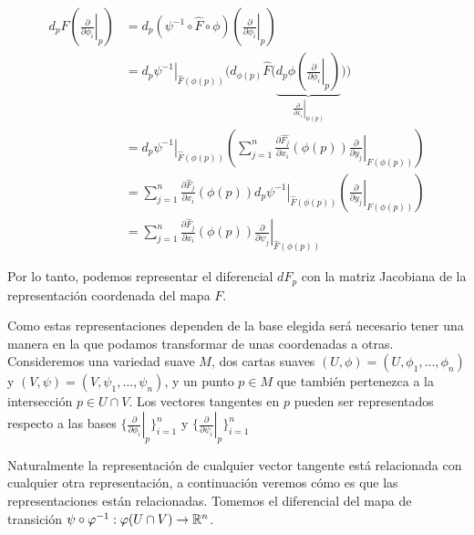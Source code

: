 \begingroup
\allowdisplaybreaks
\begin{align*}
	d_{p}F \left( \left. \frac{\partial}{\partial \phi_i} \right|_{p}\right) & =
	d_p(\psi^{-1}\circ\hat{F}\circ \phi)\left(\left.\frac{\partial}{\partial \phi_i}\right |_p\right) \\
	                                                                         & =
	\left. d_p \psi^{-1} \right|_{\hat{F}(\phi(p))}
	\Biggl(
	d_{\phi(p)} \hat{F}
	\Biggl(
	\underbrace{d_p \phi
		\left(
		\left. \frac{\partial}{\partial \phi_i} \right|_{p}
		\right)}_{\left. \frac{\partial}{\partial x_i} \right|_{\phi (p)}}
	\Biggr)	\Biggr)\\
	                                                                         & =
	\left. d_p \psi^{-1} \right|_{\hat{F}(\phi(p))}
	\left(
	\sum_{j=1}^{n} \frac{\partial \hat{F_j}}{\partial x_i} \left( \phi(p) \right)
	\left. \frac{\partial}{\partial y_j} \right|_{F(\phi(p))}
	\right)                                                                                           \\
	                                                                         & =
	\sum_{j=1}^{n} \frac{\partial \hat{F}_j}{\partial x_i} (\phi(p))
	\left. d_p \psi^{-1} \right|_{\hat{F}(\phi(p))}
	\left(
	\left. \frac{\partial}{\partial y_j}\right|_{F(\phi(p))}
	\right)                                                                                           \\
	                                                                         & =
	\sum_{j=1}^{n} \frac{\partial \hat{F}_j}{\partial x_i} (\phi(p))
	\left.
	\frac{\partial}{\partial \psi_{j}}
	\right|_{\hat{F}(\phi(p))}
\end{align*}
\endgroup

Por lo tanto, podemos representar el diferencial $dF_p$ con la matriz Jacobiana de la representación coordenada del mapa $F$.

Como estas representaciones dependen de la base elegida será necesario tener una manera en la que podamos transformar de unas coordenadas a otras. Consideremos una variedad suave $M$, dos cartas suaves $(U,\phi)=(U,\phi_1,\dots,\phi_n)$ y $(V,\psi)=(V,\psi_1,\dots,\psi_n)$, y un punto $p \in M$ que también pertenezca a la intersección $p \in U \cap V$. Los vectores tangentes en $p$ pueden ser representados respecto a las bases $\{\left. \frac{\partial}{\partial \phi_i} \right|_{p}\}_{i=1}^{n}$ y $\{\left. \frac{\partial}{\partial \psi_i} \right|_{p}\}_{i=1}^{n}$

Naturalmente la representación de cualquier vector tangente está relacionada con cualquier otra representación, a continuación veremos cómo es que las representaciones están relacionadas. Tomemos el diferencial del mapa de transición $\psi \circ \varphi^{-1}: \varphi(U \cap V) \to \mathbb{R}^n$.

